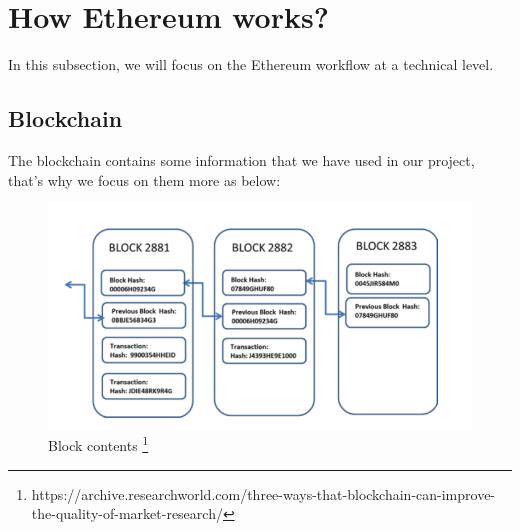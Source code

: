 \section{How Ethereum works?}
In this subsection, we will focus on the Ethereum workflow at a technical level.
\subsection{Blockchain}
The blockchain contains some information that we have used in our project, that's why we focus on them more as below:
\begin{center}
	\begin{figure}[htb!]
		
		\begin{minipage}{0.5\linewidth}
			\centering
			\includegraphics[width=1.95\textwidth]{images/chap01_Blockchain.png}
		\end{minipage}
		\caption[Block contents]{Block contents \footnote{https://archive.researchworld.com/three-ways-that-blockchain-can-improve-the-quality-of-market-research/}}
		
	\end{figure}
	
\end{center}

